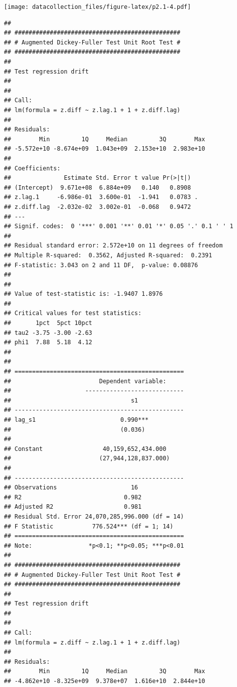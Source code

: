 \documentclass[
]{article}
\begin{document}
\texttt{[image: datacollection\_files/figure-latex/p2.1-4.pdf]}

\begin{verbatim}
## 
## ############################################### 
## # Augmented Dickey-Fuller Test Unit Root Test # 
## ############################################### 
## 
## Test regression drift 
## 
## 
## Call:
## lm(formula = z.diff ~ z.lag.1 + 1 + z.diff.lag)
## 
## Residuals:
##        Min         1Q     Median         3Q        Max 
## -5.572e+10 -8.674e+09  1.043e+09  2.153e+10  2.983e+10 
## 
## Coefficients:
##               Estimate Std. Error t value Pr(>|t|)  
## (Intercept)  9.671e+08  6.884e+09   0.140   0.8908  
## z.lag.1     -6.986e-01  3.600e-01  -1.941   0.0783 .
## z.diff.lag  -2.032e-02  3.002e-01  -0.068   0.9472  
## ---
## Signif. codes:  0 '***' 0.001 '**' 0.01 '*' 0.05 '.' 0.1 ' ' 1
## 
## Residual standard error: 2.572e+10 on 11 degrees of freedom
## Multiple R-squared:  0.3562, Adjusted R-squared:  0.2391 
## F-statistic: 3.043 on 2 and 11 DF,  p-value: 0.08876
## 
## 
## Value of test-statistic is: -1.9407 1.8976 
## 
## Critical values for test statistics: 
##       1pct  5pct 10pct
## tau2 -3.75 -3.00 -2.63
## phi1  7.88  5.18  4.12
## 
## 
## ================================================
##                         Dependent variable:     
##                     ----------------------------
##                                  s1             
## ------------------------------------------------
## lag_s1                        0.990***          
##                               (0.036)           
##                                                 
## Constant                 40,159,652,434.000     
##                         (27,944,128,837.000)    
##                                                 
## ------------------------------------------------
## Observations                     16             
## R2                             0.982            
## Adjusted R2                    0.981            
## Residual Std. Error 24,070,285,996.000 (df = 14)
## F Statistic           776.524*** (df = 1; 14)   
## ================================================
## Note:                *p<0.1; **p<0.05; ***p<0.01
## 
## ############################################### 
## # Augmented Dickey-Fuller Test Unit Root Test # 
## ############################################### 
## 
## Test regression drift 
## 
## 
## Call:
## lm(formula = z.diff ~ z.lag.1 + 1 + z.diff.lag)
## 
## Residuals:
##        Min         1Q     Median         3Q        Max 
## -4.862e+10 -8.325e+09  9.378e+07  1.616e+10  2.844e+10 

\end{verbatim}
\end{document}
